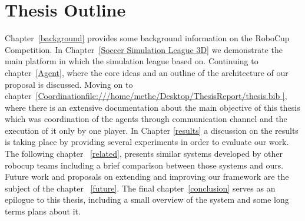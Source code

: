 \section{Thesis Outline}
Chapter~\ref{background} provides some background information on the RoboCup Competition. In Chapter~\ref{Soccer Simulation League 3D} we demonstrate the main platform in which the simulation league based on. Continuing to chapter~\ref{Agent}, where the core ideas and an outline of the architecture of our proposal is discussed. Moving on to chapter~\ref{Coordinationfile:///home/methe/Desktop/ThesisReport/thesis.bib
}, where there is an extensive documentation about the main objective of this thesis which was coordination of the agents through communication channel and the execution of it only by one player. In Chapter \ref{results} a discussion on the results is taking place by providing several experiments in order to evaluate our work. The following chapter ~\ref{related}, presents similar systems developed by other robocup teams including a brief comparison between those systems and ours. Future work and proposals on extending and improving our framework are the subject of the chapter ~\ref{future}. The final chapter~\ref{conclusion} serves as an epilogue to this thesis, including  a small overview of the system and some long terms plans about it.
